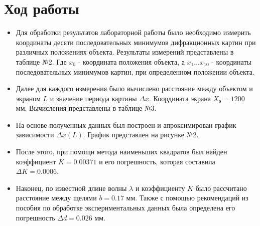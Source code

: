\documentclass{article}
\begin{document}
\section{Ход работы}
\begin{itemize}
  \item Для обработки результатов лабораторной работы было необходимо измерить координаты десяти последовательных минимумов дифракционных картин при различных положениях объекта. Результаты измерений представлены в таблице №2. Где $x_{0}$ - координата положения объекта, а $x_{1}...x_{10}$ - координаты последовательных минимумов картин, при определенном положении объекта.
  \item Далее для каждого измерения было вычислено расстояние между объектом и экраном $L$ и значение периода картины $\Delta x$. Координата экрана $X_{\textbf{э}}=1200$ мм. Вычисления представлены в таблице №3.
  \item На основе полученных данных был построен и апроксимирован график зависимости $ \Delta x(L) $. График представлен на рисунке №2.
  \item После этого, при помощи метода наименьших квадратов был найден коэффициент $K = 0.00371$ и его погрешность, которая составила $ \Delta K = 0.0006 $.
  \item Наконец, по известной длине волны $\lambda$ и коэффициенту $ K $ было рассчитано расстояние между щелями $b = 0.17$ мм. Также с помощью рекомендаций из пособия по обработке экспериментальных данных была определена его погрешность $\Delta d = 0.026$ мм.
\end{itemize}
\end{document}
